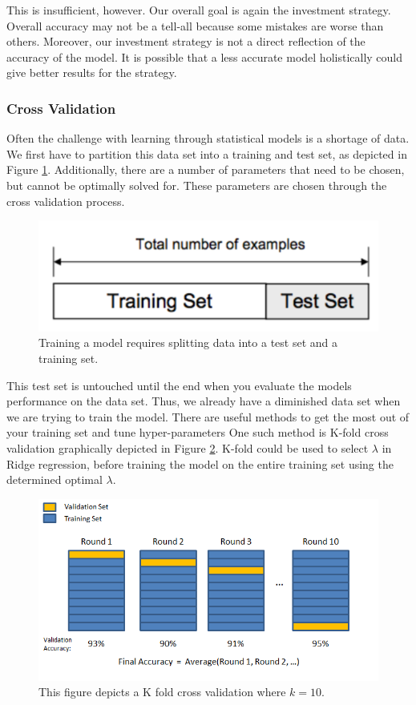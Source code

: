\documentclass[12pt]{article}
\begin{document}
This is insufficient, however. Our overall goal is again the investment strategy. Overall accuracy may not be a tell-all because some mistakes are worse than others. Moreover, our investment strategy is not a direct reflection of the accuracy of the model. It is possible that a less accurate model holistically could give better results for the strategy. 
\subsubsection{Cross Validation}
Often the challenge with learning through statistical models is a shortage of data. We first have to partition this data set into a training and test set, as depicted in Figure \ref{test_train}. Additionally, there are a number of parameters that need to be chosen, but cannot be optimally solved for. These parameters are chosen through the cross validation process.

\begin{figure}[ht]
	\centering
	\includegraphics[width=.5\textwidth]{test_train.png}
	\caption{Training a model requires splitting data into a test set and a training set. \cite{kfold}}
	\label{test_train}
\end{figure}

This test set is untouched until the end when you evaluate the models performance on the data set. Thus, we already have a diminished data set when we are trying to train the model. There are useful methods to get the most out of your training set and tune hyper-parameters One such method is K-fold cross validation graphically depicted in Figure \ref{kfold}. K-fold could be used to select $\lambda$ in Ridge regression, before training the model on the entire training set using the determined optimal $\lambda$.

\begin{figure}[ht]
	\centering
	\includegraphics[width=.5\textwidth]{kfold.png}
	\caption{This figure depicts a K fold cross validation where $k=10$. \cite{kfold}}
	\label{kfold}
\end{figure}
\end{document}
